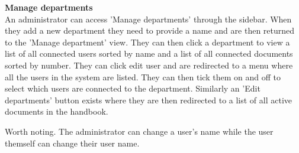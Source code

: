 \textbf{Manage departments}
\\
An administrator can access 'Manage departments' through the sidebar.
When they add a new department they need to provide a name and are then returned to the 'Manage department' view.
They can then click a department to view a list of all connected users sorted by name and a list of all connected documents sorted by number.
They can click edit user and are redirected to a menu where all the users in the system are listed.
They can then tick them on and off to select which users are connected to the department.
Similarly an 'Edit departments' button exists where they are then redirected to a list of all active documents in the handbook.

Worth noting. The administrator can change a user's name while the user themself can change their user name.
